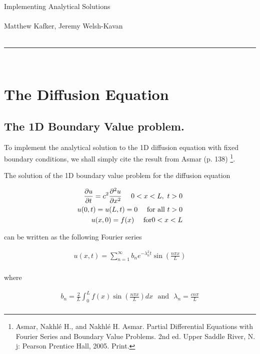 \documentclass[]{article}
\begin{document}
{\Huge Implementing Analytical Solutions}\\
\hfill \\
{Matthew Kafker, Jeremy Welsh-Kavan}\\
\hfill \\
\noindent\rule{15cm}{0.4pt} \\


\section{The Diffusion Equation}

\subsection{The 1D Boundary Value problem.}

To implement the analytical solution to the 1D diffusion equation with fixed boundary conditions, we shall simply cite the result from Asmar (p. 138) \footnote{Asmar, Nakhlé H., and Nakhlé H. Asmar. Partial Differential Equations with Fourier Series and Boundary Value Problems. 2nd ed. Upper Saddle River, N. j: Pearson Prentice Hall, 2005. Print.}. 

The solution of the 1D boundary value problem for the diffusion equation 

\begin{equation}
\begin{split}
\pdv{u}{t} = c^2 \pdv[2]{u}{x} ~~~~ 0 < x < L, ~ t > 0 \\
u(0,t) = u(L,t) = 0 ~~~~ \text{for all} ~ t > 0 \\
u(x, 0) = f(x) ~~~~ \text{for} 0 < x < L\\
\end{split}
\end{equation}

can be written as the following Fourier series

\begin{equation}
\begin{split}
u(x, t) = \sum_{n=1}^{\infty} b_n e^{- \lambda_n^2 t} \sin( \frac{ n \pi x}{ L } ) \\
\end{split}
\end{equation}

where 

\begin{equation}
\begin{split}
b_n = \frac{2}{L} \int_{0}^{L} f(x)  \sin( \frac{ n \pi x}{ L } )  dx ~~~ \text{and} ~~~ \lambda_n = \frac{c n \pi}{L} \\
\end{split}
\end{equation}
\end{document}
